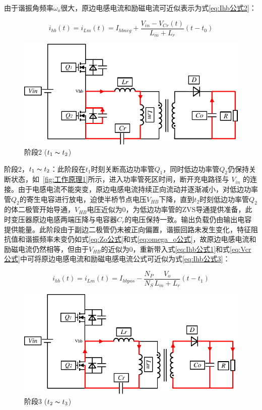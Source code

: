 由于谐振角频率$\omega_o$很大，原边电感电流和励磁电流可近似表示为式\eqref{eq:Ihb公式2}：

\begin{equation}
    \label{eq:Ihb公式2}
    i_{hb}(t) = i_{Lm}(t) = I_{hbneg} + \frac{V_{in}-V_{Cr}(t)}{L_m + L_r}(t-t_0)
\end{equation}


\begin{figure}[htbp] 
    \centering
    \includegraphics[width=0.6\linewidth]{figures/工作原理2.pdf}
    \caption{阶段2 ($t_1 \thicksim t_2$)}
    \label{fig:工作原理2}
\end{figure}
                
阶段2，$t_1 \thicksim t_2$：此阶段在$t_1$时刻关断高边功率管$Q_1$，同时低边功率管$Q_2$仍保持关断状态，如~\ref{fig:工作原理1}所示，进入功率管死区时间，断开充电路径与 $V_{in}$ 的连接。由于电感电流不能突变，原边电感电流持续正向流动并逐渐减小，对低边功率管$Q_2$的寄生电容进行放电，迫使半桥节点电压$V_{HB}$下降，直到$t_2$时刻低边功率管$Q_2$的体二极管开始导通，$V_{HB}$电压近似为0，为低边功率管的ZVS导通提供准备，此时变压器原边电感两端压降与电容器$C_r$的电压保持一致。输出负载仍由输出电容提供能量。此阶段由于副边二极管仍未被正向偏置，谐振回路未发生变化，特征阻抗值和谐振频率未变仍如式\eqref{eq:Zo公式}和式\eqref{eq:omega_o公式}，故原边电感电流和励磁电流仍然相等，但由于$V_{HB}$的近似为0，重新带入式\eqref{eq:Ihb公式1}和式\eqref{eq:Vcr公式}中可将原边电感电流和励磁电感电流公式可近似为式\eqref{eq:Ihb公式3}：

\begin{equation}
    \label{eq:Ihb公式3}
    i_{hb}(t) = i_{Lm}(t) = I_{hbpos} - \frac{N_P}{N_S} \frac{V_o}{L_m + L_r}(t-t_1)
\end{equation}

                
\begin{figure}[htbp] 
    \centering
    \includegraphics[width=0.6\linewidth]{figures/工作原理3.pdf}
    \caption{阶段3 ($t_2 \thicksim t_3$)}
    \label{fig:工作原理3}
\end{figure}

